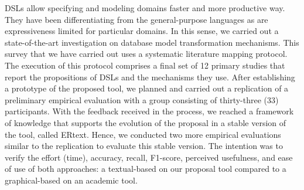 \begin{resumo}[Abstract]
DSLs allow specifying and modeling domains faster and more productive way. They have been differentiating from the general-purpose languages as are expressiveness limited for particular domains.
In this sense, we carried out a state-of-the-art investigation on database model transformation mechanisms.
This survey that we have carried out uses a systematic literature mapping protocol.
The execution of this protocol comprises a final set of 12 primary studies that report the propositions of DSLs and the mechanisms they use.
After establishing a prototype of the proposed tool, we planned and carried out a replication of a preliminary empirical evaluation with a group consisting of thirty-three (33) participants.
With the feedback received in the process, we reached a framework of knowledge that supports the evolution of the proposal in a stable version of the tool, called ERtext.
Hence, we conducted two more empirical evaluations similar to the replication to evaluate this stable version.
The intention was to verify the effort (time), accuracy, recall, F1-score, perceived usefulness, and ease of use of both approaches: a textual-based on our proposal tool compared to a graphical-based on an academic tool.

\end{resumo}
